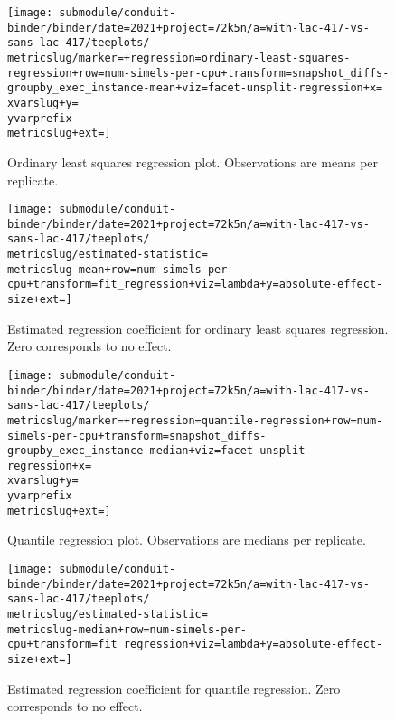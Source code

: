 \begin{figure*}[h]
  \centering

  \begin{subfigure}[b]{0.5\textwidth}
    \centering
    \texttt{[image: submodule/conduit-binder/binder/date=2021+project=72k5n/a=with-lac-417-vs-sans-lac-417/teeplots/\\metricslug/marker=+regression=ordinary-least-squares-regression+row=num-simels-per-cpu+transform=snapshot\_diffs-groupby\_exec\_instance-mean+viz=facet-unsplit-regression+x=\\xvarslug+y=\\yvarprefix\\metricslug+ext=]}
    \caption{
      Ordinary least squares regression plot.
      Observations are means per replicate.
    }
    \label{fig:with-lac-417-vs-sans-lac-417-regression-ols-\metricslug-complete-regression}
  \end{subfigure}%
  \begin{subfigure}[b]{0.5\textwidth}
    \centering
    \texttt{[image: submodule/conduit-binder/binder/date=2021+project=72k5n/a=with-lac-417-vs-sans-lac-417/teeplots/\\metricslug/estimated-statistic=\\metricslug-mean+row=num-simels-per-cpu+transform=fit\_regression+viz=lambda+y=absolute-effect-size+ext=]}
    \caption{Estimated regression coefficient for ordinary least squares regression. Zero corresponds to no effect.}
    \label{fig:with-lac-417-vs-sans-lac-417-regression-ols-\metricslug-complete-effect-size}
  \end{subfigure}

  \begin{subfigure}[b]{0.5\textwidth}
    \centering
    \texttt{[image: submodule/conduit-binder/binder/date=2021+project=72k5n/a=with-lac-417-vs-sans-lac-417/teeplots/\\metricslug/marker=+regression=quantile-regression+row=num-simels-per-cpu+transform=snapshot\_diffs-groupby\_exec\_instance-median+viz=facet-unsplit-regression+x=\\xvarslug+y=\\yvarprefix\\metricslug+ext=]}
    \caption{
      Quantile regression plot.
      Observations are medians per replicate.
    }
    \label{fig:with-lac-417-vs-sans-lac-417-regression-quantile-\metricslug-complete-regression}
  \end{subfigure}%
  \begin{subfigure}[b]{0.5\textwidth}
    \centering
    \texttt{[image: submodule/conduit-binder/binder/date=2021+project=72k5n/a=with-lac-417-vs-sans-lac-417/teeplots/\\metricslug/estimated-statistic=\\metricslug-median+row=num-simels-per-cpu+transform=fit\_regression+viz=lambda+y=absolute-effect-size+ext=]}
    \caption{Estimated regression coefficient for quantile regression. Zero corresponds to no effect.}
    \label{fig:with-lac-417-vs-sans-lac-417-regression-quantile-\metricslug-complete-effect-size}
  \end{subfigure}


\end{figure*}
